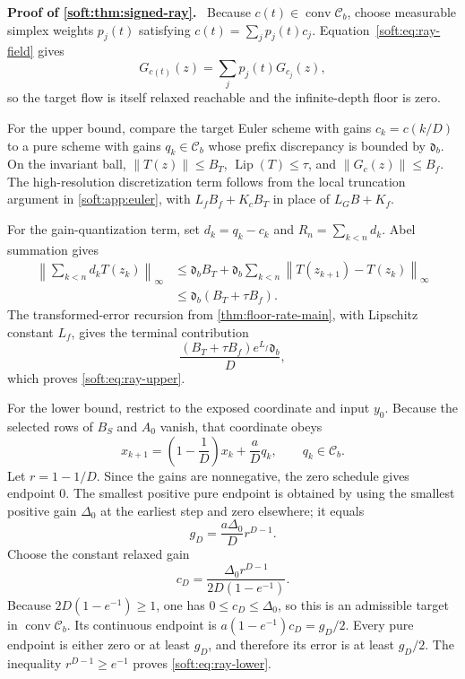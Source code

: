 \documentclass[twoside,11pt]{article}
\renewenvironment{proof}[1][Proof]{\par\noindent\textbf{#1.}\ }{\hfill\BlackBox\par\medskip}
\newcommand{\conv}{\operatorname{conv}}
\newcommand{\Lip}{\operatorname{Lip}}
\newcommand{\norm}[1]{\left\lVert #1\right\rVert}
\begin{document}
\begin{proof}[Proof of \cref{soft:thm:signed-ray}]
Because $c(t)\in\conv\mathcal C_b$, choose measurable simplex weights $p_j(t)$ satisfying $c(t)=\sum_jp_j(t)c_j$.  Equation~\eqref{soft:eq:ray-field} gives
\[
  G_{c(t)}(z)=\sum_jp_j(t)G_{c_j}(z),
\]
so the target flow is itself relaxed reachable and the infinite-depth floor is zero.

For the upper bound, compare the target Euler scheme with gains $c_k=c(k/D)$ to a pure scheme with gains $q_k\in\mathcal C_b$ whose prefix discrepancy is bounded by $\mathfrak d_b$.  On the invariant ball, $\norm{T(z)}\le B_T$, $\Lip(T)\le\tau$, and $\norm{G_c(z)}\le B_f$.  The high-resolution discretization term follows from the local truncation argument in \cref{soft:app:euler}, with $L_fB_f+K_cB_T$ in place of $L_GB+K_f$.

For the gain-quantization term, set $d_k=q_k-c_k$ and $R_n=\sum_{k<n}d_k$.  Abel summation gives
\begin{align*}
  \left\|\sum_{k<n}d_kT(z_k)\right\|_\infty
  &\le \mathfrak d_b B_T+
  \mathfrak d_b\sum_{k<n}\norm{T(z_{k+1})-T(z_k)}_\infty\\
  &\le \mathfrak d_b(B_T+\tau B_f).
\end{align*}
The transformed-error recursion from \cref{thm:floor-rate-main}, with Lipschitz constant $L_f$, gives the terminal contribution
\[
  \frac{(B_T+\tau B_f)e^{L_f}\mathfrak d_b}{D},
\]
which proves \eqref{soft:eq:ray-upper}.

For the lower bound, restrict to the exposed coordinate and input $y_0$.  Because the selected rows of $B_S$ and $A_0$ vanish, that coordinate obeys
\begin{equation}
  x_{k+1}=\left(1-\frac1D\right)x_k+\frac{a}{D}q_k,
  \qquad q_k\in\mathcal C_b.
  \label{soft:eq:exposed-recursion}
\end{equation}
Let $r=1-1/D$.  Since the gains are nonnegative, the zero schedule gives endpoint $0$.  The smallest positive pure endpoint is obtained by using the smallest positive gain $\Delta_0$ at the earliest step and zero elsewhere; it equals
\[
  g_D=\frac{a\Delta_0}{D}r^{D-1}.
\]
Choose the constant relaxed gain
\begin{equation}
  c_D=\frac{\Delta_0 r^{D-1}}{2D(1-e^{-1})}.
  \label{soft:eq:valid-hard-gain}
\end{equation}
Because $2D(1-e^{-1})\ge1$, one has $0\le c_D\le\Delta_0$, so this is an admissible target in $\conv\mathcal C_b$.  Its continuous endpoint is $a(1-e^{-1})c_D=g_D/2$.  Every pure endpoint is either zero or at least $g_D$, and therefore its error is at least $g_D/2$.  The inequality $r^{D-1}\ge e^{-1}$ proves \eqref{soft:eq:ray-lower}.
\end{proof}
\end{document}
